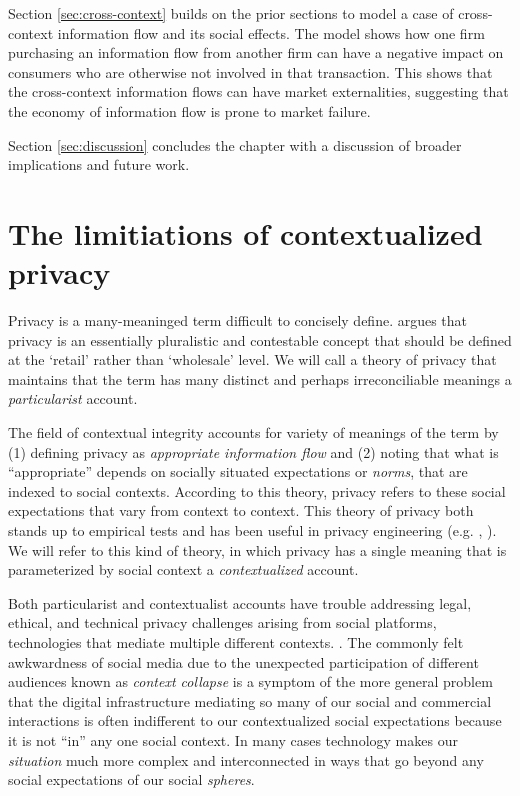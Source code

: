 \documentclass[../thesis.tex]{subfiles}
\begin{document}
Section \ref{sec:cross-context} builds on the prior
sections to model a case of cross-context information
flow and its social effects.
The model shows how one firm purchasing an information
flow from another firm can have a negative impact
on consumers who are otherwise not involved in that
transaction.
This shows that the cross-context information flows
can have market externalities, suggesting that
the economy of information flow is prone to market failure.

Section \ref{sec:discussion} concludes the chapter
with a discussion of broader implications and future
work.

\section{The limitiations of contextualized privacy}
\label{sec:limitations}

Privacy is a many-meaninged term
difficult \cite{solove2005taxonomy} to concisely define.
\cite{mulligan2016privacy} argues that privacy is an
essentially pluralistic and contestable
concept that should be defined at the `retail' rather
than `wholesale' level.
We will call a theory of privacy that maintains
that the term has many distinct and perhaps irreconciliable
meanings a \emph{particularist} account.

The field of contextual integrity \cite{nissenbaum09book}
accounts for variety of meanings of the term by
(1) defining privacy
as \emph{appropriate information flow} and
(2) noting
that what is ``appropriate'' depends on socially situated
expectations or \emph{norms}, that are indexed to social
contexts.
According to this theory, privacy refers to these
social expectations that vary from context
to context.
This theory of privacy both stands up to empirical tests
\cite{martin2016measuring} and has been useful in
privacy engineering (e.g. \cite{shvartzshnaider2016learning},
\cite{benthall2017contextual}).
We will refer to this kind of theory, in which
privacy has a single meaning that is parameterized
by social context a \emph{contextualized} account.

Both particularist and contextualist accounts have trouble addressing legal,
ethical, and technical privacy challenges arising from
social platforms, technologies
that mediate multiple different contexts.
\cite{benthall2017contextual}.
The commonly felt awkwardness of social media due to
the unexpected participation of different audiences
known as \emph{context collapse}
\cite{marwick2011tweet} \cite{davis2014context}
is a symptom of the more general problem
that the digital infrastructure mediating so many
of our social and commercial interactions
is often indifferent to our contextualized social
expectations because it is not ``in'' any one
social context.
In many cases technology makes our \emph{situation}
much more complex and interconnected in ways that
go beyond any social expectations of our social
\emph{spheres}.
\end{document}
